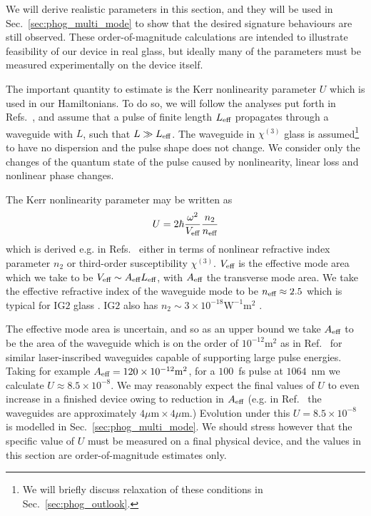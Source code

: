 We will derive realistic parameters in this section, and they will be used in Sec.~\ref{sec:phog_multi_mode} to show that the desired signature behaviours are still observed. These order-of-magnitude calculations are intended to illustrate feasibility of our device in real glass, but ideally many of the parameters must be measured experimentally on the device itself.

The important quantity to estimate is the Kerr nonlinearity parameter $U$ which is used in our Hamiltonians. To do so, we will follow the analyses put forth in Refs.~\cite{Drummond1980, Imoto1985, Kitagawa1986}, and assume that a pulse of finite length $L_{\text{eff}}$ propagates through a waveguide with $L$, such that $L \gg L_{\text{eff}}$. The waveguide in $\chi^{\left(3\right)}$ glass is assumed\footnote{We will briefly discuss relaxation of these conditions in Sec.~\ref{sec:phog_outlook}.} to have no dispersion and the pulse shape does not change. We consider only the changes of the quantum state of the pulse caused by nonlinearity, linear loss and nonlinear phase changes. 

The Kerr nonlinearity parameter may be written as 
\begin{equation}
U = 2 \hbar \frac{\omega^2}{V_{\text{eff}}} \frac{n_2}{n_{\text{eff}}}
\end{equation}
which is derived e.g. in Refs.~\cite{Imoto1985, Kitagawa1986, Drummond1980} either in terms of nonlinear refractive index parameter $n_2$ or third-order susceptibility $\chi^{\left(3\right)}$. $V_{\text{eff}}$ is the effective mode area which we take to be $V_{\text{eff}} \sim A_{\text{eff}} L_{\text{eff}}$, with $A_{\text{eff}}$ the transverse mode area. We take the effective refractive index of the waveguide mode to be $n_{\text{eff}} \approx 2.5$ which is typical for IG$2$ glass \cite{ig2}. IG$2$ also has $n_2 \sim 3 \times 10^{-18} \text{W}^{-1} \text{m}^2$ \cite{Demetriou2017, Wang2014}. %

The effective mode area is uncertain, and so as an upper bound we take $A_{\text{eff}}$ to be the area of the waveguide which is on the order of $10^{-12}\text{m}^2$ as in Ref.~\cite{Mukherjee2017} for similar laser-inscribed waveguides  capable of supporting large pulse energies. Taking for example $A_{\text{eff}} = 120\times10^{-12} \text{m}^2$, for a $100$~fs pulse at $1064$~nm we calculate $U \approx 8.5\times 10^{-8}$. We may reasonably expect the final values of $U$ to even increase in a finished device owing to reduction in $A_{\text{eff}}$ (e.g. in Ref.~\cite{Mukherjee2017} the waveguides are approximately $4 \mu\text{m} \times 4 \mu\text{m}$.) Evolution under this $U = 8.5\times10^{-8}$ is modelled in Sec.~\ref{sec:phog_multi_mode}. We should stress however that the specific value of $U$ must be measured on a final physical device, and the values in this section are order-of-magnitude estimates only.

